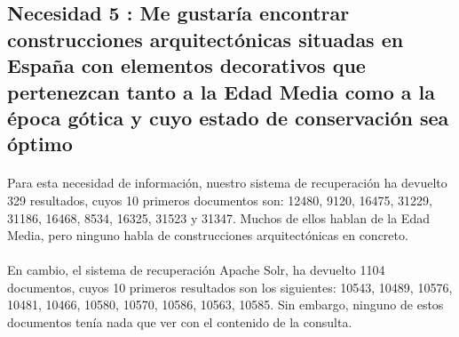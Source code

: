 \documentclass[a4paper]{article}
\begin{document}
\subsection{Necesidad 5 : Me gustaría encontrar construcciones arquitectónicas situadas en España con elementos decorativos que pertenezcan tanto a la Edad Media como a la época gótica y cuyo estado de conservación sea óptimo}
\paragraph{}Para esta necesidad de información, nuestro sistema de recuperación ha devuelto 329 resultados, cuyos 10 primeros documentos son: 12480, 9120, 16475, 31229, 31186, 16468, 8534, 16325, 31523 y 31347.
Muchos de ellos hablan de la Edad Media, pero ninguno habla de construcciones arquitectónicas en concreto.
\paragraph{}En cambio, el sistema de recuperación Apache Solr, ha devuelto 1104 documentos, cuyos 10 primeros resultados son los siguientes: 10543, 10489, 10576, 10481, 10466, 10580, 10570, 10586, 10563, 10585. Sin embargo, ninguno de estos documentos tenía nada que ver con el contenido de la consulta.
\end{document}
